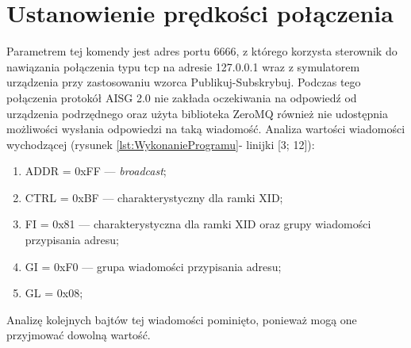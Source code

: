 
\section{Ustanowienie prędkości połączenia}
Parametrem tej komendy jest adres portu 6666, z którego korzysta sterownik do nawiązania połączenia typu tcp na adresie 127.0.0.1 wraz z symulatorem urządzenia
przy zastosowaniu wzorca Publikuj-Subskrybuj. Podczas tego połączenia protokół AISG 2.0 nie zakłada oczekiwania na odpowiedź od urządzenia podrzędnego oraz użyta biblioteka
ZeroMQ również nie udostępnia możliwości wysłania odpowiedzi na taką wiadomość.
\newline\newline
Analiza wartości wiadomości wychodzącej (rysunek \ref{lst:WykonanieProgramu}- linijki [3; 12]):
\begin{enumerate}
    \item ADDR = 0xFF --- \textit{broadcast};
    \item CTRL = 0xBF --- charakterystyczny dla ramki XID;
    \item FI = 0x81 --- charakterystyczna dla ramki XID oraz grupy wiadomości przypisania adresu;
    \item GI = 0xF0 --- grupa wiadomości przypisania adresu;
    \item GL = 0x08;
\end{enumerate}
Analizę kolejnych bajtów tej wiadomości pominięto, ponieważ mogą one przyjmować dowolną wartość. 


